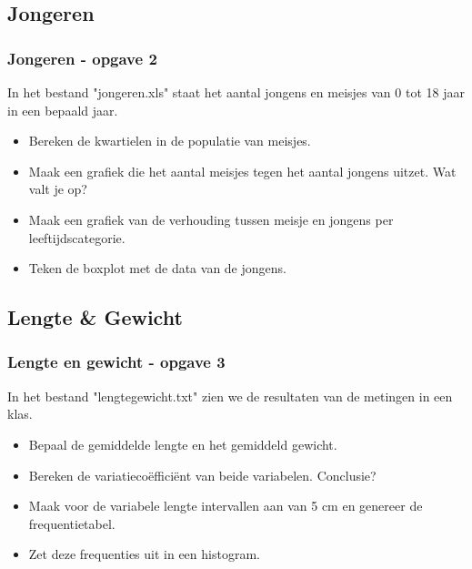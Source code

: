 \documentclass{beamer}
\newif\ifoplossing
\begin{document}
\subsection{Jongeren}
\begin{frame}
	\frametitle{Jongeren - opgave 2}
	In het bestand "jongeren.xls" staat het aantal jongens en meisjes van 0 tot 18 jaar in een bepaald jaar.
		\begin{itemize}
			\item Bereken de kwartielen in de populatie van meisjes.
			\item Maak een grafiek die het aantal meisjes tegen het aantal jongens uitzet. Wat valt je op?
			\item Maak een grafiek van de verhouding tussen meisje en jongens per leeftijdscategorie.
			\item Teken de boxplot met de data van de jongens.
		\end{itemize}
\end{frame}

\ifoplossing
	\begin{frame}
		
	\end{frame}

\fi
\subsection{Lengte \& Gewicht}
\begin{frame}
	\frametitle{Lengte en gewicht - opgave 3}
	In het bestand "lengtegewicht.txt" zien we de resultaten van de metingen in een klas.
		\begin{itemize}
			\item Bepaal de gemiddelde lengte en het gemiddeld gewicht.
			\item Bereken de variatiecoëfficiënt van beide variabelen.  Conclusie?
			\item Maak voor de variabele lengte intervallen aan van 5 cm en genereer de frequentietabel.
			\item Zet deze frequenties uit in een histogram.
		\end{itemize}
\end{frame}

\ifoplossing
\begin{frame}[fragile]
	
\end{frame}
\fi
\end{document}
